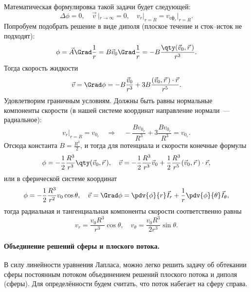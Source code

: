Математическая формулировка такой задачи будет следующей:
\begin{equation}
    \Delta \phi = 0, \quad
    \vec{v}\,|_{r\to \infty}=0, \quad
    v_r |_{r=R}=v_{\text{сф}_r}|_{r=R}.
\end{equation}
Попробуем подобрать решение в виде диполя (плоское течение и сток--исток не подходят):
\begin{equation}
    \phi = \vec{A} \Grad \frac{1}{r} = B \vec{v}_0 \Grad \frac{1}{r}=
    -B \frac{\qty(\vec{v}_0,\vec{r}\,)}{r^3}.
\end{equation}
Тогда скорость жидкости
\begin{equation}
    \vec{v} = \Grad \phi = -B \frac{\vec{v}_0}{r^3} +
    3B \frac{(\vec{v}_0,\vec{r}\,)\cdot \vec{r}}{r^5}.
\end{equation}
Удовлетворим граничным условиям. Должны быть равны нормальные компоненты скорости (в нашей системе координат направление нормали~--- радиальное):
\begin{equation}
    v_r |_{r=R}= v_{0_r} \quad\Rightarrow\quad
    -\frac{B{v_{0_r}}}{R^3}
    +3\frac{B v_{0_r}}{R^3} = v_{0_r}.
\end{equation}
Отсюда константа $B=\frac{R^3}{2}$, и тогда для потенциала и скорости конечные формулы
\begin{equation}
    \phi = -\frac{1}{2} \frac{R^3}{r^3} \qty(\vec{v}_0,\vec{r}\,), \quad
    \vec{v} = -\frac{1}{2} \frac{R^3}{r^3} \vec{v}_0
    +\frac{1}{2} \frac{R^3}{r^5} (\vec{v}_0,\vec{r}\,)\cdot \vec{r},
\end{equation}
или в  сферической системе координат
\begin{equation}
    \phi = -\frac{1}{2} \frac{R^3}{r^2} v_0 \cos\theta, \quad
    \vec{v} = \Grad\phi = \pdv{\phi}{r} \vec{I}_r +
    \frac{1}{r} \pdv{\phi}{\theta} \vec{I}_\theta,
\end{equation}
тогда радиальная и тангенциальная компоненты скорости соответственно равны
\begin{equation}
    v_r= \frac{v_0 R^3}{r^3}\cos\theta, \quad
    v_\theta = \frac{v_0 R^3}{2r^3} \sin\theta.
\end{equation}

\paragraph{Объединение решений сферы и плоского потока.} В силу линейности уравнения Лапласа, можно легко решить задачу об обтекании сферы постоянным потоком объединением решений плоского потока и диполя (сферы). Для определённости будем считать, что поток набегает на сферу справа.


